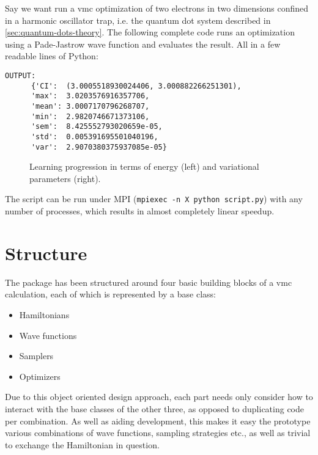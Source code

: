 \documentclass[Thesis.tex]{subfiles}
\begin{document}
Say we want run a \gls{vmc} optimization of two electrons in two
dimensions confined in a harmonic oscillator trap, i.e. the quantum dot system
described in \cref{sec:quantum-dots-theory}. The following complete code runs an
optimization using a Pade-Jastrow wave function and evaluates the result. All in
a few readable lines of Python:\\



\begin{lstlisting}[basicstyle=\scriptsize]
  OUTPUT:
      {'CI':  (3.0005518930024406, 3.000882266251301),
      'max':  3.0203576916357706,
      'mean': 3.0007170796268707,
      'min':  2.9820746671373106,
      'sem':  8.425552793020659e-05,
      'std':  0.005391695501040196,
      'var':  2.9070380375937085e-05}
\end{lstlisting}

\begin{figure}[h]
  \centering
      
  \caption[Learning progression of an example \gls{vmc} optimization]{Learning progression in terms of energy (left) and variational
    parameters (right).}
  \label{fig:quickstart-example}
\end{figure}

\noindent The script can be run under MPI (\texttt{mpiexec -n X python script.py}) with any number of processes, which results in almost completely linear speedup.

\section{Structure}

The package has been structured around four basic building blocks of a \gls{vmc}
calculation, each of which is represented by a base class:

\begin{itemize}
\item Hamiltonians
\item Wave functions
\item Samplers
\item Optimizers
\end{itemize}

Due to this object oriented design approach, each part needs only consider how
to interact with the base classes of the other three, as opposed to duplicating
code per combination. As well as aiding development, this makes it easy the
prototype various combinations of wave functions, sampling strategies etc., as
well as trivial to exchange the Hamiltonian in question.
\end{document}
